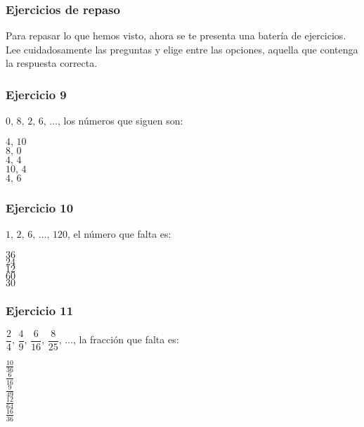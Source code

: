 \begin{frame}
\frametitle{Ejercicios de repaso}
Para repasar lo que hemos visto, ahora se te presenta una batería de ejercicios.
\\
\bigskip
\pause
Lee cuidadosamente las preguntas y elige entre las opciones, aquella que contenga la respuesta correcta.
\end{frame}
\begin{frame}
\frametitle{Ejercicio 9}
$0, \, 8, \, 2, \, 6, \, \ldots$, los números que siguen son:
\begin{choices}
\choice $4, \, 10$ \\
\choice $8, \, 0$ \\
\choice $4, \, 4$ \\
\choice $10, \, 4$ \\
\choice $4, \, 6$
\end{choices}
\pause
{}
\end{frame}
\begin{frame}
\frametitle{Ejercicio 10}
$1, \, 2, \, 6, \, \ldots, \, 120$, el número que falta es:
\begin{choices}
\choice $36$ \\
\choice $24$ \\
\choice $12$ \\
\choice $60$ \\
\choice $30$
\end{choices}
\pause
{}
\end{frame}
\begin{frame}
\frametitle{Ejercicio 11}
$\dfrac{2}{4}, \, \dfrac{4}{9}, \, \dfrac{6}{16}, \, \dfrac{8}{25}, \, \ldots$, la fracción que falta es:
\\
\bigskip
\begin{choices}
\choice $\frac{10}{36}$ \\
\choice $\frac{6}{16}$ \\
\choice $\frac{9}{49}$ \\
\choice $\frac{12}{64}$ \\
\choice $\frac{16}{36}$
\end{choices}
\pause
{}
\end{frame}
